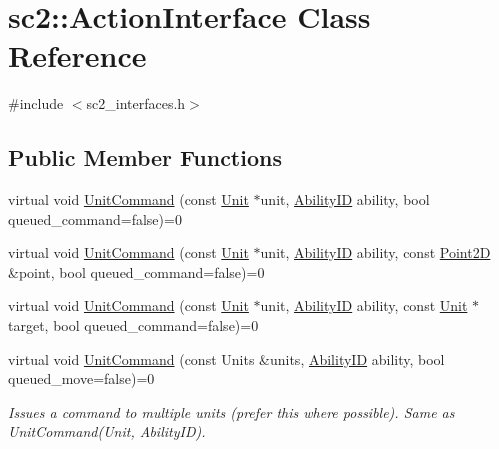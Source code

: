 \hypertarget{classsc2_1_1_action_interface}{}\section{sc2\+:\+:Action\+Interface Class Reference}
\label{classsc2_1_1_action_interface}


{\ttfamily \#include $<$sc2\+\_\+interfaces.\+h$>$}

\subsection*{Public Member Functions}
\begin{DoxyCompactItemize}
\item 
virtual void \hyperlink{classsc2_1_1_action_interface_add138c6ebe9b1fcbeae393c03b7fdeb9}{Unit\+Command} (const \hyperlink{classsc2_1_1_unit}{Unit} $\ast$unit, \hyperlink{classsc2_1_1_s_c2_type}{Ability\+ID} ability, bool queued\+\_\+command=false)=0
\item 
virtual void \hyperlink{classsc2_1_1_action_interface_a7387d718d7d87c69b8476ca0d8a9f86a}{Unit\+Command} (const \hyperlink{classsc2_1_1_unit}{Unit} $\ast$unit, \hyperlink{classsc2_1_1_s_c2_type}{Ability\+ID} ability, const \hyperlink{structsc2_1_1_point2_d}{Point2D} \&point, bool queued\+\_\+command=false)=0
\item 
virtual void \hyperlink{classsc2_1_1_action_interface_a63a3bb86851927cc58821afb0d21e1ab}{Unit\+Command} (const \hyperlink{classsc2_1_1_unit}{Unit} $\ast$unit, \hyperlink{classsc2_1_1_s_c2_type}{Ability\+ID} ability, const \hyperlink{classsc2_1_1_unit}{Unit} $\ast$target, bool queued\+\_\+command=false)=0
\item 
\mbox{\label{classsc2_1_1_action_interface_aa647e739696bc228f44f7e1224d21733}} 
virtual void \hyperlink{classsc2_1_1_action_interface_aa647e739696bc228f44f7e1224d21733}{Unit\+Command} (const Units \&units, \hyperlink{classsc2_1_1_s_c2_type}{Ability\+ID} ability, bool queued\+\_\+move=false)=0
\begin{DoxyCompactList}\small\item\em Issues a command to multiple units (prefer this where possible). Same as Unit\+Command(\+Unit, Ability\+I\+D). \end{DoxyCompactList}\item 
\mbox{\label{classsc2_1_1_action_interface_aeea8f2ca32bfe3ee1835bddb9d1356f1}} 

\end{DoxyCompactItemize}
